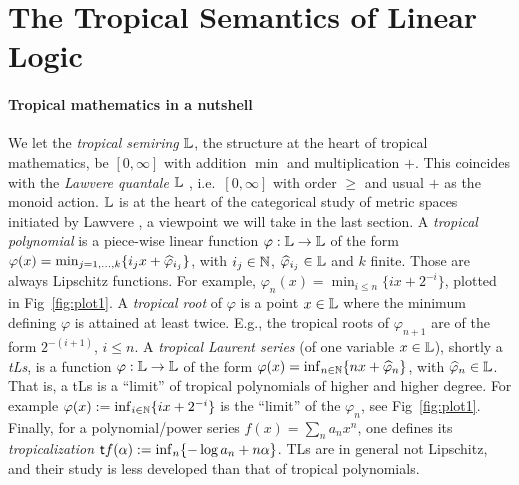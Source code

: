 \documentclass[submission,%
]{eptcs}
\begin{document}
\section{The Tropical Semantics of Linear Logic }

\paragraph{Tropical mathematics in a nutshell}

We let the \emph{tropical semiring}  $\mathbb{L}$, the structure at the heart of tropical mathematics, be $[0,\infty]$ with addition $\min$ and multiplication $+$.
This coincides with the \emph{Lawvere quantale} $\mathbb{L}$ \cite{Hofmann2014, Stubbe2014}, i.e.\ $[0,\infty]$ with order $\geq$ and usual $+$ as the monoid action. 
$\mathbb{L}$ is at the heart of the categorical study of metric spaces initiated by Lawvere \cite{Lawvere1973}, a viewpoint we will take in the last section.
A \emph{tropical polynomial} is a piece-wise linear function $\varphi:\mathbb{L}\to \mathbb{L}$ of the form $\varphi(x)=\min_{j=1,\dots,k}\{i_{j}x+\widehat{\varphi}_{i_{j}}\}$, with $i_{j}\in\mathbb{N}$, $\widehat{\varphi}_{i_{j}}\in\mathbb{L}$ and $k$ finite.
Those are always Lipschitz functions.
For example, $\varphi_{n}(x)=\min_{i\leq n}\{ix+2^{-i}\}$, plotted in Fig~\ref{fig:plot1}.
A \emph{tropical root} of $\varphi$ is a point $x\in \mathbb{L}$ where the minimum defining $\varphi$ is attained at least twice. %
E.g., the tropical roots of $\varphi_{n+1}$ are of the form $2^{-(i+1)}$, $i \leq n$.
A \emph{tropical Laurent series} (of one variable $x\in\mathbb{L}$), shortly a \emph{tLs}, is a function $\varphi:\mathbb{L}\to \mathbb{L}$ of the form $\varphi(x)=\inf_{n\in\mathbb{N}}\{nx+\widehat{\varphi}_{n}\}$, with $\widehat{\varphi}_{n}\in\mathbb{L}$.
That is, a tLs is a ``limit'' of tropical polynomials of higher and higher degree.
For example $\varphi(x):=\inf_{i\in\mathbb{N}}\{ix+2^{-i}\}$ %
is the ``limit'' of the $\varphi_{n}$, see Fig~\ref{fig:plot1}. %
Finally, for a polynomial/power series $f(x)=\sum_n a_nx^n$, one defines its \emph{tropicalization} $\mathsf{t} f(\alpha):=\inf_n\{-\log a_n+n\alpha\}$.
TLs are in general not Lipschitz, and their study is less developed than that of tropical polynomials.
\end{document}
